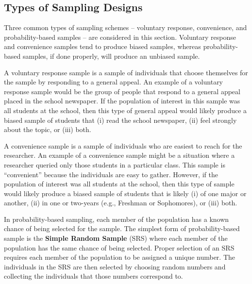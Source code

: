 \documentclass[10pt,openany]{book}\usepackage[]{graphicx}\usepackage[]{color}
\begin{document}

\subsection{Types of Sampling Designs}
Three common types of sampling schemes -- voluntary response, convenience, and probability-based samples -- are considered in this section.  Voluntary response and convenience samples tend to produce biased samples, whereas probability-based samples, if done properly, will produce an unbiased sample.

A voluntary response sample is a sample of individuals that choose themselves for the sample by responding to a general appeal.  An example of a voluntary response sample would be the group of people that respond to a general appeal placed in the school newspaper.  If the population of interest in this sample was all students at the school, then this type of general appeal would likely produce a biased sample of students that (i) read the school newspaper, (ii) feel strongly about the topic, or (iii) both.

A convenience sample is a sample of individuals who are easiest to reach for the researcher.  An example of a convenience sample might be a situation where a researcher queried only those students in a particular class.  This sample is ``convenient'' because the individuals are easy to gather.  However, if the population of interest was all students at the school, then this type of sample would likely produce a biased sample of students that is likely (i) of one major or another, (ii) in one or two-years (e.g., Freshman or Sophomores), or (iii) both.


\vspace{-12pt}

\vspace{-12pt}

In probability-based sampling, each member of the population has a known chance of being selected for the sample.  The simplest form of probability-based sample is the \textbf{Simple Random Sample} (SRS) where each member of the population has the same chance of being selected.  Proper selection of an SRS requires each member of the population to be assigned a unique number.  The individuals in the SRS are then selected by choosing random numbers and collecting the individuals that those numbers correspond to.
\end{document}
